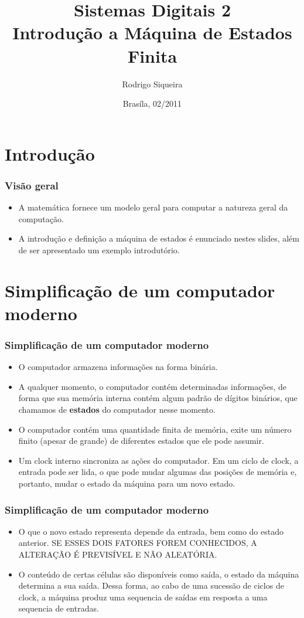 \documentclass{beamer}
\title{Sistemas Digitais 2\\ \textbf{Introdução a Máquina de Estados Finita}}
\author{Rodrigo Siqueira}
\date{Brasíla, 02/2011}
\institute{\textbf{Universidade de Brasília - Faculdade do Gama}}
\begin{document}
\begin{frame}
  \titlepage
\end{frame}

\section{Introdução}
\begin{frame}
  \frametitle{Visão geral}
  \begin{itemize}
   \item A matemática fornece um modelo geral para computar a natureza geral da computação.\pause
   \item A introdução e definição a máquina de estados é enunciado nestes slides, além de ser apresentado um exemplo introdutório.
  \end{itemize}
\end{frame}

\section{Simplificação de um computador moderno}
  \begin{frame}
   \frametitle{Simplificação de um computador moderno }
   \begin{itemize}
    \item O computador armazena informações na forma binária.\pause
    \item A qualquer momento, o computador contém determinadas informações, de forma que sua memória interna contém algum padrão de 
	  dígitos binários, que chamamos de \textbf{estados} do computador nesse momento. \pause
    \item O computador contém uma quantidade finita de memória, exite um número finito (apesar de grande) de diferentes estados que 
	  ele pode assumir.\pause
    \item Um clock interno sincroniza as ações do computador. Em um ciclo de clock, a entrada pode ser lida, o que pode mudar algumas 
	  das posições de memória e, portanto, mudar o estado da máquina para um novo estado.
   \end{itemize}
  \end{frame}

  \begin{frame}
   \frametitle{Simplificação de um computador moderno }
   \begin{itemize}
    \item O que o novo estado representa depende da entrada, bem como do estado anterior. SE ESSES DOIS FATORES FOREM CONHECIDOS, A 
	  ALTERAÇÃO É PREVISÍVEL E NÃO ALEATÓRIA.\pause
    \item O conteúdo de certas células são disponíveis como saída, o estado da máquina determina a sua saída. Dessa forma, ao cabo de 
	  uma sucessão de ciclos de clock, a máquina produz uma sequencia de saídas em resposta a uma sequencia de entradas.
   \end{itemize}
  \end{frame}
\end{document}
